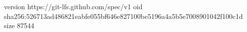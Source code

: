 version https://git-lfs.github.com/spec/v1
oid sha256:526713ad486821eabfe055bf646e827100be5196a4a5b5e7008901042f100c1d
size 87544
